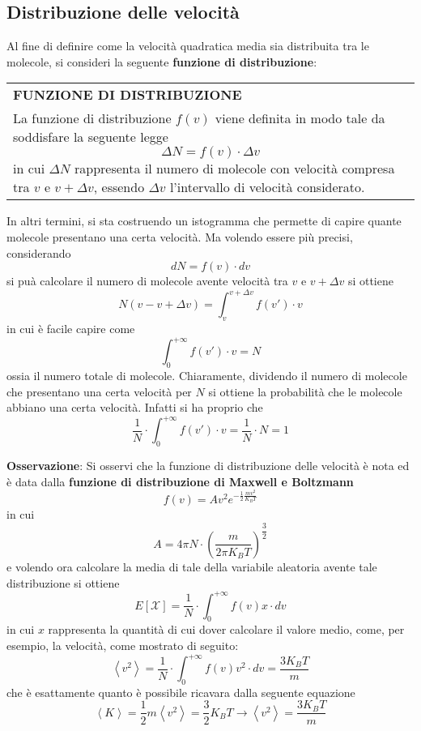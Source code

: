 \documentclass[a4paper]{extarticle}
\renewcommand\arraystretch{}
\begin{document}
\vspace{1em}
\subsection{Distribuzione delle velocità}
Al fine di definire come la velocità quadratica media sia distribuita tra le molecole, si consideri la seguente \textbf{funzione di distribuzione}:

\vspace{1em}
\setlength{\tabcolsep}{14pt}
\renewcommand{\arraystretch}{2}
\noindent
\begin{tabularx}{\textwidth}{@{}|P|@{}}
    \hline
    {\textbf{FUNZIONE DI DISTRIBUZIONE}}\\
    \parbox{\linewidth}{La funzione di distribuzione $f(v)$ viene definita in modo tale da soddisfare la seguente legge
    \[\Delta N = f(v) \cdot \Delta v\]
    in cui $\Delta N$ rappresenta il numero di molecole con velocità compresa tra $v$ e $v + \Delta v$, essendo $\Delta v$ l'intervallo di velocità considerato.\vspace{3mm}}\\
    \hline
\end{tabularx}

\vspace{1em}
\noindent
In altri termini, si sta costruendo un istogramma che permette di capire quante molecole presentano una certa velocità. Ma volendo essere più precisi, considerando
\[dN = f(v) \cdot dv\]
si puà calcolare il numero di molecole avente velocità tra $v$ e $v+\Delta v$ si ottiene
\[N(v - v + \Delta v) = \int_{v}^{v+\Delta v} f(v') \cdot v\]
in cui è facile capire come
\[\int_{0}^{+\infty} f(v') \cdot v = N\]
ossia il numero totale di molecole. Chiaramente, dividendo il numero di molecole che presentano una certa velocità per $N$ si ottiene la probabilità che le molecole abbiano una certa velocità. Infatti si ha proprio che
\[\frac{1}{N} \cdot \int_{0}^{+\infty} f(v') \cdot v = \frac{1}{N} \cdot N = 1\]

\vspace{1em}
\noindent
\textbf{Osservazione}: Si osservi che la funzione di distribuzione delle velocità è nota ed è data dalla \textbf{funzione di distribuzione di Maxwell e Boltzmann}
\[\boxed{f(v) = A v^2 e^{\displaystyle{-\frac{1}{2} \frac{m v^2}{K_B T}}}}\]
in cui
\[\boxed{A = 4 \pi N \cdot \left(\frac{m}{2\pi K_B T}\right)^{\dfrac{3}{2}}}\]
e volendo ora calcolare la media di tale della variabile aleatoria avente tale distribuzione si ottiene
\[E[\mathcal{X}] = \frac{1}{N} \cdot \int_0^{+\infty} f(v) x \cdot dv\]
in cui $x$ rappresenta la quantità di cui dover calcolare il valore medio, come, per esempio, la velocità, come mostrato di seguito:
\[\left<v^2\right> = \frac{1}{N} \cdot \int_0^{+\infty} f(v) v^2 \cdot dv = \frac{3 K_B T}{m}\]
che è esattamente quanto è possibile ricavara dalla seguente equazione
\[\left<K\right>=\frac{1}{2}m \left<v^2\right> = \frac{3}{2} K_B T \longrightarrow \left<v^2\right>=\frac{3 K_B T}{m}\]
\end{document}
